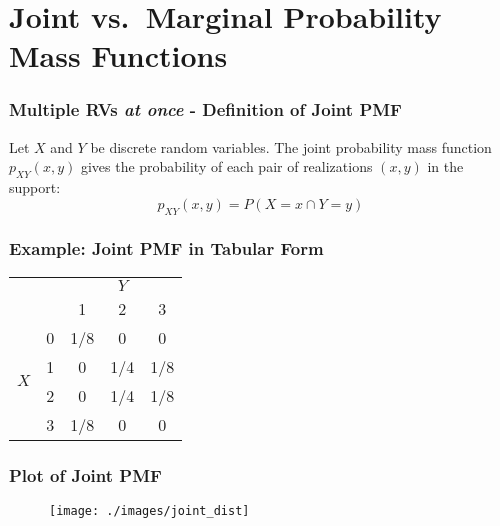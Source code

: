 \section{Joint vs.\ Marginal Probability Mass Functions}

\begin{frame}
  \frametitle{Multiple RVs \emph{at once} - Definition of Joint PMF}
Let $X$ and $Y$ be discrete random variables. The joint probability mass function $p_{XY}(x,y)$ gives the probability of each pair of realizations $(x,y)$ in the support:
\Large
 $$\boxed{p_{XY}(x,y) = P(X = x \cap Y=y)}$$

\end{frame}
\begin{frame}
\frametitle{Example: Joint PMF in Tabular Form}

\begin{table}
\begin{tabular}{|cc|ccc|}
\hline
&&\multicolumn{3}{c|}{$Y$}\\
&&1 & 2&3\\
\hline
\multirow{4}{*}{$X$}
&0& \multicolumn{1}{|c}{\alert{1/8}} & \alert{0}& \alert{0}\\
&1& \multicolumn{1}{|c}{\alert{0}} & \alert{1/4}&\alert{1/8}\\
&2& \multicolumn{1}{|c}{\alert{0}} & \alert{1/4}&\alert{1/8}\\
&3& \multicolumn{1}{|c}{\alert{1/8}} & \alert{0}&\alert{0}\\
\hline
\end{tabular}
\end{table}

\end{frame}
\begin{frame}
\frametitle{Plot of Joint PMF}
\begin{figure}
	\texttt{[image: ./images/joint\_dist]}
\end{figure}

\end{frame}



